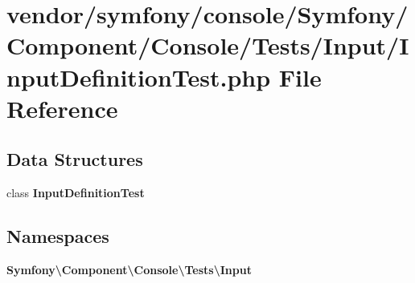 \section{vendor/symfony/console/\+Symfony/\+Component/\+Console/\+Tests/\+Input/\+Input\+Definition\+Test.php File Reference}
\label{_input_definition_test_8php}
\subsection*{Data Structures}
\begin{DoxyCompactItemize}
\item 
class {\bf Input\+Definition\+Test}
\end{DoxyCompactItemize}
\subsection*{Namespaces}
\begin{DoxyCompactItemize}
\item 
 {\bf Symfony\textbackslash{}\+Component\textbackslash{}\+Console\textbackslash{}\+Tests\textbackslash{}\+Input}
\end{DoxyCompactItemize}
